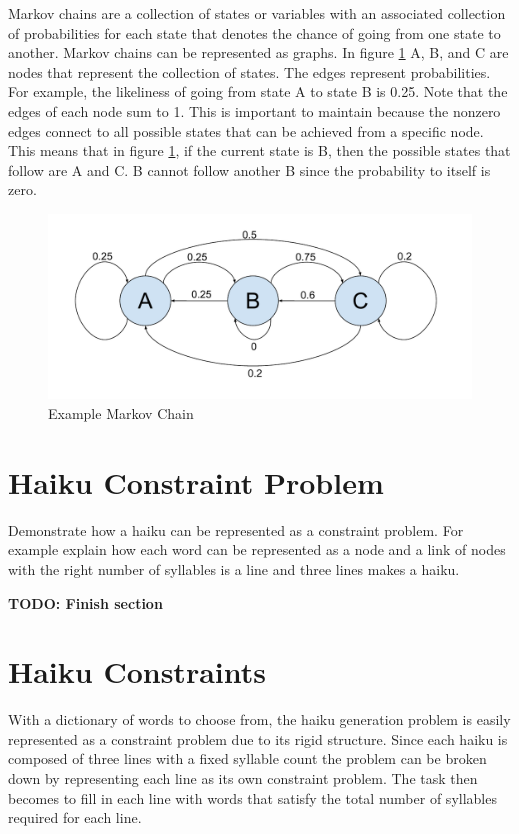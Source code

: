 \documentclass[]{article}
\newcommand{\comment}[1]
{\par {\bfseries \color{green} #1 \par}}
\begin{document}
Markov chains are a collection of states or variables with an associated collection of probabilities for each state that denotes the chance of going from one state to another. Markov chains can be represented as graphs. In figure \ref{fig:Chain} A, B, and C are nodes that represent the collection of states. The edges represent probabilities. For example, the likeliness of going from state A to state B is 0.25. Note that the edges of each node sum to 1. This is important to maintain because the nonzero edges connect to all possible states that can be achieved from a specific node. This means that in figure \ref{fig:Chain}, if the current state is B, then the possible states that follow are A and C. B cannot follow another B since the probability to itself is zero. \cite{Markov}

\begin{figure}[H]
	\centering
	\includegraphics[width=1\textwidth]{MarkovChainExample}
	\caption{Example Markov Chain}
	\label{fig:Chain}
\end{figure}

\section{Haiku Constraint Problem}
Demonstrate how a haiku can be represented as a constraint problem. For example explain how each word can be represented as a node and a link of nodes with the right number of syllables is a line and three lines makes a haiku.
\comment{TODO: Finish section}
\section{Haiku Constraints}
With a dictionary of words to choose from, the haiku generation problem is easily represented as a constraint problem due to its rigid structure. Since each haiku is composed of three lines with a fixed syllable count the problem can be broken down by representing each line as its own constraint problem. The task then becomes to fill in each line with words that satisfy the total number of syllables required for each line.
\end{document}

